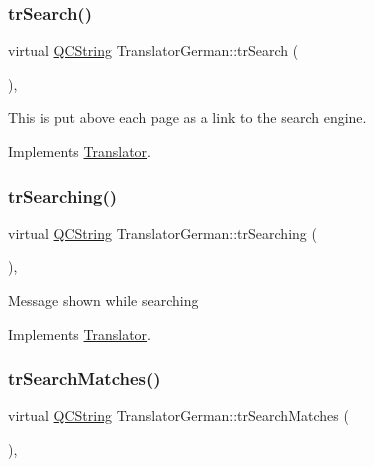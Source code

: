 \subsubsection{\texorpdfstring{trSearch()}{trSearch()}}
{\footnotesize\ttfamily virtual \mbox{\hyperlink{class_q_c_string}{Q\+C\+String}} Translator\+German\+::tr\+Search (\begin{DoxyParamCaption}{ }\end{DoxyParamCaption})\hspace{0.3cm}{\ttfamily [inline]}, {\ttfamily [virtual]}}

This is put above each page as a link to the search engine. 

Implements \mbox{\hyperlink{class_translator}{Translator}}.

\mbox{\label{class_translator_german_a725087ef72c6af5da0bf3072ee09be8b}} 
\subsubsection{\texorpdfstring{trSearching()}{trSearching()}}
{\footnotesize\ttfamily virtual \mbox{\hyperlink{class_q_c_string}{Q\+C\+String}} Translator\+German\+::tr\+Searching (\begin{DoxyParamCaption}{ }\end{DoxyParamCaption})\hspace{0.3cm}{\ttfamily [inline]}, {\ttfamily [virtual]}}

Message shown while searching 

Implements \mbox{\hyperlink{class_translator}{Translator}}.

\mbox{\label{class_translator_german_ad5471f4edf26ef3f7066cc3eba448b6d}} 
\subsubsection{\texorpdfstring{trSearchMatches()}{trSearchMatches()}}
{\footnotesize\ttfamily virtual \mbox{\hyperlink{class_q_c_string}{Q\+C\+String}} Translator\+German\+::tr\+Search\+Matches (\begin{DoxyParamCaption}{ }\end{DoxyParamCaption})\hspace{0.3cm}{\ttfamily [inline]}, {\ttfamily [virtual]}}

